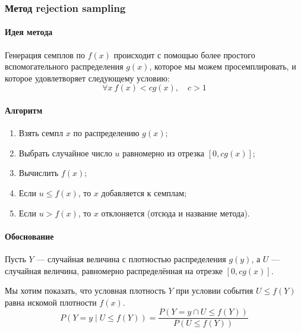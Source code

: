 \documentclass[a4paper,14pt]{extarticle}
\begin{document}
            \subsubsection*{Метод rejection sampling}
                
                \paragraph{Идея метода}
                    Генерация семплов по $f(x)$ происходит с помощью более простого вспомогательного распределения $g(x)$, которое мы можем просемплировать, и которое удовлетворяет следующему условию:
                    \[
                    \forall x \ f(x)<cg(x), \quad c > 1
                    \]
                
                \paragraph{Алгоритм}
                    \begin{enumerate}
                            \item Взять семпл $x$ по распределению $g(x)$;
                            \item Выбрать случайное число $u$ равномерно из отрезка $[0,cg(x)]$;
                            \item Вычислить $f(x)$;
                            \item Если $u \leq f(x)$, то $x$ добавляется к семплам;
                            \item Если $u > f(x)$, то $x$ отклоняется (отсюда и название метода).
                    \end{enumerate}
                
                \paragraph{Обоснование}
                    Пусть $Y$ — случайная величина с плотностью распределения $g(y)$, а $U$ — случайная величина, равномерно распределённая на отрезке $[0, cg(x)]$.
                    
                    Мы хотим показать, что условная плотность $Y$ при условии события $U \leq f(Y)$ равна искомой плотности $f(x)$.
                    \[
                    P(Y = y \mid U \leq f(Y)) =
                    \frac{P(Y = y \cap U \leq f(Y))}{P(U \leq f(Y))}
                    \]
                    
\end{document}
